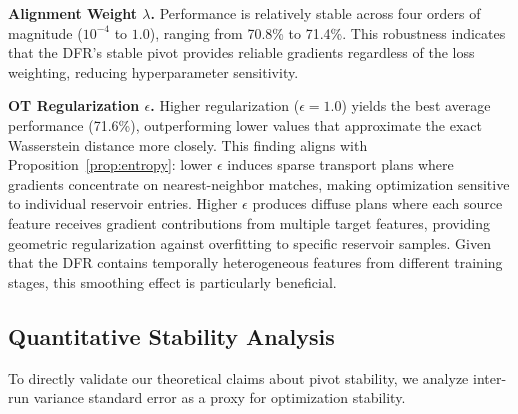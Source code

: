 \documentclass[preprint,12pt]{elsarticle}
\providecommand{\DIFadd}[1]{{\protect\color{blue} \sf #1}} %
\providecommand{\DIFdel}[1]{{\protect\color{red} \scriptsize #1}} %
\providecommand{\DIFaddbegin}{} %
\providecommand{\DIFaddend}{} %
\providecommand{\DIFdelbegin}{} %
\providecommand{\DIFdelend}{} %
\newcommand{\DIFscaledelfig}{0.5}
\newlength{\DIFdelgraphicswidth} %
\newlength{\DIFdelgraphicsheight} %
\newcommand{\DIFaddincludegraphics}[2][]{{\color{blue}\fbox{\DIFOincludegraphics[#1]{#2}}}} %
\newcommand{\DIFdelincludegraphics}[2][]{%
\sbox{\DIFdelgraphicsbox}{\DIFOincludegraphics[#1]{#2}}%
\settoboxwidth{\DIFdelgraphicswidth}{\DIFdelgraphicsbox} %
\settoboxtotalheight{\DIFdelgraphicsheight}{\DIFdelgraphicsbox} %
\scalebox{\DIFscaledelfig}{%
\parbox[b]{\DIFdelgraphicswidth}{\usebox{\DIFdelgraphicsbox}\\[-\baselineskip] \rule{\DIFdelgraphicswidth}{0em}}\llap{\resizebox{\DIFdelgraphicswidth}{\DIFdelgraphicsheight}{%
\setlength{\unitlength}{\DIFdelgraphicswidth}%
\begin{picture}(1,1)%
\thicklines\linethickness{2pt} %
{\color[rgb]{1,0,0}\put(0,0){\framebox(1,1){}}}%
{\color[rgb]{1,0,0}\put(0,0){\line( 1,1){1}}}%
{\color[rgb]{1,0,0}\put(0,1){\line(1,-1){1}}}%
\end{picture}%
}\hspace*{3pt}}} %
} %
\DeclareRobustCommand{\DIFaddbegin}{\DIFOaddbegin \let\includegraphics\DIFaddincludegraphics} %
\DeclareRobustCommand{\DIFaddend}{\DIFOaddend \let\includegraphics\DIFOincludegraphics} %
\DeclareRobustCommand{\DIFdelbegin}{\DIFOdelbegin \let\includegraphics\DIFdelincludegraphics} %
\DeclareRobustCommand{\DIFdelend}{\DIFOaddend \let\includegraphics\DIFOincludegraphics} %
\begin{document}
\textbf{Alignment Weight $\lambda$.} Performance is relatively stable across four orders of magnitude ($10^{-4}$ to $1.0$), ranging from 70.8\% to 71.4\%. This robustness indicates that the DFR's stable pivot provides reliable gradients regardless of the loss weighting, reducing hyperparameter sensitivity.

\textbf{OT Regularization $\epsilon$.} Higher regularization ($\epsilon = 1.0$) yields the best average performance (71.6\%), outperforming lower values that approximate the exact Wasserstein distance more closely. This finding aligns with Proposition~\ref{prop:entropy}: lower $\epsilon$ induces sparse transport plans where gradients concentrate on nearest-neighbor matches, making optimization sensitive to individual reservoir entries. Higher $\epsilon$ produces diffuse plans where each source feature receives gradient contributions from multiple target features, providing geometric regularization against overfitting to specific reservoir samples.
\DIFdelbegin \DIFdel{Given that the DFR contains temporally heterogeneous features from different training stages, this smoothing effect is particularly beneficial.
}\DIFdelend 

\subsection{Quantitative Stability Analysis}
\label{ssec:stability_analysis}

To directly validate our theoretical claims about pivot stability, we analyze inter-run \DIFdelbegin \DIFdel{variance }\DIFdelend \DIFaddbegin \DIFadd{standard error }\DIFaddend as a proxy for optimization stability.
\end{document}
